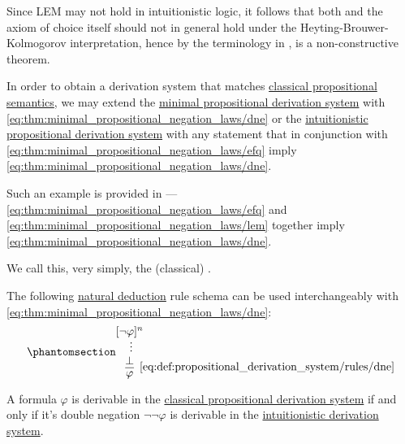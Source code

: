 \begin{proposition}
\begin{proposition}
\begin{example}
  Since LEM may not hold in intuitionistic logic, it follows that both  and the axiom of choice itself should not in general hold under the Heyting-Brouwer-Kolmogorov interpretation, hence by the terminology in ,  is a non-constructive theorem.
\end{example}

\begin{definition}\label{def:propositional_derivation_system}
  In order to obtain a derivation system that matches \hyperref[def:propositional_semantics]{classical propositional semantics}, we may extend the \hyperref[def:minimal_propositional_derivation_system]{minimal propositional derivation system} with \eqref{eq:thm:minimal_propositional_negation_laws/dne} or the \hyperref[def:intuitionistic_propositional_derivation_system]{intuitionistic propositional derivation system} with any statement that in conjunction with \eqref{eq:thm:minimal_propositional_negation_laws/efq} imply \eqref{eq:thm:minimal_propositional_negation_laws/dne}.

  Such an example is provided in  --- \eqref{eq:thm:minimal_propositional_negation_laws/efq} and \eqref{eq:thm:minimal_propositional_negation_laws/lem} together imply \eqref{eq:thm:minimal_propositional_negation_laws/dne}.

  We call this, very simply, the (classical) .

   The following \hyperref[thm:natural_dediction]{natural deduction} rule schema can be used interchangeably with \eqref{eq:thm:minimal_propositional_negation_laws/dne}:
  \begin{equation*}\taglabel[\textrm{DNE}]{eq:def:propositional_derivation_system/rules/dne}
    \begin{prooftree}
      \hypo{ [\neg \varphi]^n }
      \ellipsis {} { \bot }
      \infer1[\ref{eq:def:propositional_derivation_system/rules/dne}]{ \varphi }
    \end{prooftree}
  \end{equation*}
\end{definition}

\begin{theorem}\label{thm:glivenkos_double_negation_theorem}
  A formula \( \varphi \) is derivable in the \hyperref[def:propositional_derivation_system]{classical propositional derivation system} if and only if it's double negation \( \neg \neg \varphi \) is derivable in the \hyperref[def:intuitionistic_propositional_derivation_system]{intuitionistic derivation system}.
\end{theorem}


\end{proposition}
\end{proposition}
